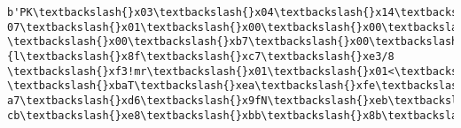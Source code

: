 \documentclass[11pt]{article}
\begin{document}
    \begin{Verbatim}[commandchars=\\\{\}]
b'PK\textbackslash{}x03\textbackslash{}x04\textbackslash{}x14\textbackslash{}x00\textbackslash{}x00\textbackslash{}x00\textbackslash{}x08\textbackslash{}x00\textbackslash{}x00\textbackslash{}x00!\textbackslash{}x00M\textbackslash{}xd0\textbackslash{}xda\textbackslash{}xa1\textbackslash{}xb7\textbackslash{}x00\textbackslash{}x00\textbackslash{}x00\textbackslash{}x
07\textbackslash{}x01\textbackslash{}x00\textbackslash{}x00\textbackslash{}x06\textbackslash{}x00\textbackslash{}x14\textbackslash{}x00PK.npy\textbackslash{}x01\textbackslash{}x00\textbackslash{}x10\textbackslash{}x00\textbackslash{}x07\textbackslash{}x01\textbackslash{}x00\textbackslash{}x00\textbackslash{}x00\textbackslash{}x00\textbackslash{}x00
\textbackslash{}x00\textbackslash{}xb7\textbackslash{}x00\textbackslash{}x00\textbackslash{}x00\textbackslash{}x00\textbackslash{}x00\textbackslash{}x00\textbackslash{}x00\textbackslash{}x9d\textbackslash{}x8d1N\textbackslash{}x041\textbackslash{}x10\textbackslash{}x04\textbackslash{}xc7c\{l\textbackslash{}x8f\textbackslash{}xc7\textbackslash{}xe3/8
\textbackslash{}xf3!mr\textbackslash{}x01\textbackslash{}x01<\textbackslash{}x80\textbackslash{}x0cDB@\textbackslash{}x84V\textbackslash{}xdc"\textbackslash{}x82\textbackslash{}x13\textbackslash{}x87v\textbackslash{}x81\textbackslash{}x04x\textbackslash{}x05\textbackslash{}x1f\textbackslash{}xc6|\textbackslash{}x81\textbackslash{}xce
\textbackslash{}xbaT\textbackslash{}xea\textbackslash{}xfe\textbackslash{}xb9\textbackslash{}xb9\textbackslash{}xbb\textbackslash{}xbe\textbackslash{}xbd7\textbackslash{}xf0\textbackslash{}x01\textbackslash{}x9f\textbackslash{}xfd\textbackslash{}xb0l\textbackslash{}x8fk\textbackslash{}xbfl\textbackslash{}xfd\textbackslash{}xeb\}\textbackslash{}xdf\textbackslash{}x
a7\textbackslash{}xd6\textbackslash{}x9fN\textbackslash{}xeb\textbackslash{}xdb:\textbackslash{}xbf<\textbackslash{}x9c\textbackslash{}xd6\textbackslash{}xc3\textbackslash{}xf2\textbackslash{}xc7\textbackslash{}xaf\textbackslash{}xe6\textbackslash{}xe3\textbackslash{}xb6\textbackslash{}x0c\textbackslash{}xbe=\textbackslash{}xcf\textbackslash{}xaf\textbackslash{}x
cb\textbackslash{}xe8\textbackslash{}xbb\textbackslash{}x8b\textbackslash{}xa9\textbackslash{}xed\textbackslash{}xcf\textbackslash{}xcf\textbackslash{}xa6\textbackslash{}xf6\textbackslash{}xdd\textbackslash{}xfe\textbackslash{}x1b\textbackslash{}xa6\textbackslash{}x04>\textbackslash{}x14\textbackslash{}xa9\textbackslash{}xc4\textbackslash{}x84l\textbackslash{}xd8

\end{Verbatim}
\end{document}
